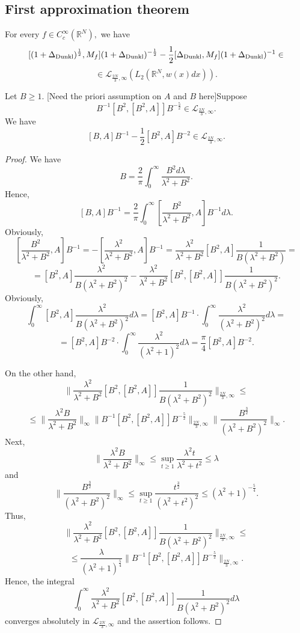 \documentclass{amsart}
\begin{document}
\subsection{First approximation theorem}

\begin{theorem}\label{first approximation theorem} For every $f\in C^{\infty}_c(\mathbb{R}^N),$ we have
$$[(1+\Delta_{{\rm Dunkl}})^{\frac12},M_f](1+\Delta_{{\rm Dunkl}})^{-\frac12}-\frac12[\Delta_{{\rm Dunkl}},M_f](1+\Delta_{{\rm Dunkl}})^{-1}\in$$
$$\in\mathcal{L}_{\frac{2N}{3},\infty}(L_2(\mathbb{R}^N,w(x)dx)).$$
\end{theorem}

\begin{lemma}\label{cgrs-like abstract lemma} Let $B\geq 1.$ {\color{red}[Need the priori assumption on $A$ and $B$ here]}Suppose
$$B^{-1}[B^2,[B^2,A]]B^{-\frac{5}{2}}\in\mathcal{L}_{\frac{2N}{3},\infty}.$$
We have
$$[B,A]B^{-1}-\frac12[B^2,A]B^{-2}\in\mathcal{L}_{\frac{2N}{3},\infty}.$$
\end{lemma}
\begin{proof} We have
$$B=\frac{2}{\pi}\int_0^{\infty}\frac{B^2d\lambda}{\lambda^2+B^2}.$$
Hence,
$$[B,A]B^{-1}=\frac{2}{\pi}\int_0^{\infty}[\frac{B^2}{\lambda^2+B^2},A]B^{-1}d\lambda.$$
Obviously,
$$[\frac{B^2}{\lambda^2+B^2},A]B^{-1}=-[\frac{\lambda^2}{\lambda^2+B^2},A]B^{-1}=\frac{\lambda^2}{\lambda^2+B^2}[B^2,A]\frac1{B(\lambda^2+B^2)}=$$
$$=[B^2,A]\frac{\lambda^2}{B(\lambda^2+B^2)^2}-\frac{\lambda^2}{\lambda^2+B^2}[B^2,[B^2,A]]\frac1{B(\lambda^2+B^2)^2}.$$
Obviously,
$$\int_0^{\infty}[B^2,A]\frac{\lambda^2}{B(\lambda^2+B^2)^2}d\lambda=[B^2,A]B^{-1}\cdot \int_0^{\infty}\frac{\lambda^2}{(\lambda^2+B^2)^2}d\lambda=$$
$$=[B^2,A]B^{-2}\cdot \int_0^{\infty}\frac{\lambda^2}{(\lambda^2+1)^2}d\lambda=\frac{\pi}{4}[B^2,A]B^{-2}.$$

On the other hand,
$$\|\frac{\lambda^2}{\lambda^2+B^2}[B^2,[B^2,A]]\frac1{B(\lambda^2+B^2)^2}\|_{\frac{2N}{3},\infty}\leq$$
$$\leq\|\frac{\lambda^2B}{\lambda^2+B^2}\|_{\infty}\|B^{-1}[B^2,[B^2,A]]B^{-\frac{5}{2}}\|_{\frac{2N}{3},\infty}\|\frac{B^{\frac32}}{(\lambda^2+B^2)^2}\|_{\infty}.$$
Next,
$$\|\frac{\lambda^2B}{\lambda^2+B^2}\|_{\infty}\leq\sup_{t\geq1}\frac{\lambda^2t}{\lambda^2+t^2}\leq\lambda$$
and
$$\|\frac{B^{\frac32}}{(\lambda^2+B^2)^2}\|_{\infty}\leq\sup_{t\geq1}\frac{t^{\frac32}}{(\lambda^2+t^2)^2}\leq(\lambda^2+1)^{-\frac54}.$$
Thus,
$$\|\frac{\lambda^2}{\lambda^2+B^2}[B^2,[B^2,A]]\frac1{B(\lambda^2+B^2)^2}\|_{\frac{2N}{3},\infty}\leq$$
$$\leq\frac{\lambda}{(\lambda^2+1)^{\frac54}}\|B^{-1}[B^2,[B^2,A]]B^{-\frac{5}{2}}\|_{\frac{2N}{3},\infty}.$$
Hence, the integral
$$\int_0^{\infty}\frac{\lambda^2}{\lambda^2+B^2}[B^2,[B^2,A]]\frac1{B(\lambda^2+B^2)^2}d\lambda$$
converges absolutely in $\mathcal{L}_{\frac{2N}{3},\infty}$ and the assertion follows.
\end{proof}
\end{document}
